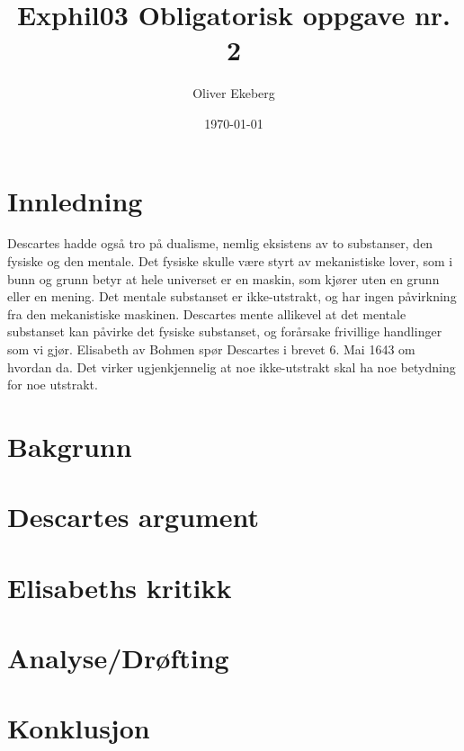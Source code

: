 \documentclass[11pt, a4paper]{article}
\title{Exphil03 Obligatorisk oppgave nr. 2}
\author{Oliver Ekeberg}
\date{\today}
\begin{document}
\maketitle

\tableofcontents


\section{Innledning}

Descartes hadde også tro på dualisme, nemlig eksistens av to substanser, den fysiske og den mentale. Det fysiske skulle være styrt av mekanistiske lover, som i bunn og grunn betyr at hele universet er en maskin, som kjører uten en grunn eller en mening. Det mentale substanset er ikke-utstrakt, og har ingen påvirkning fra den mekanistiske maskinen. Descartes mente allikevel at det mentale substanset kan påvirke det fysiske substanset, og forårsake frivillige handlinger som vi gjør. Elisabeth av Bohmen spør Descartes i brevet 6. Mai 1643 om hvordan da. Det virker ugjenkjennelig at noe ikke-utstrakt skal ha noe betydning for noe utstrakt.


\section{Bakgrunn}


\section{Descartes argument}


\section{Elisabeths kritikk}


\section{Analyse/Drøfting}



\section{Konklusjon}
\end{document}
